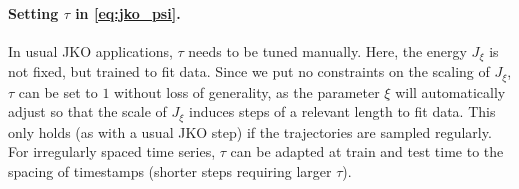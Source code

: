 
\paragraph{Setting $\tau$ in \eqref{eq:jko_psi}.} 
In usual \acrshort{JKO} applications, $\tau$ needs to be tuned manually. Here, the energy $J_\xi$ is not fixed, but trained to fit data. Since we put no constraints on the scaling of $J_\xi$, $\tau$ can be set to $1$ without loss of generality, as the parameter $\xi$ will automatically adjust so that the scale of $J_\xi$ induces steps of a relevant length to fit data. This only holds (as with a usual \acrshort{JKO} step) if the trajectories are sampled regularly. For irregularly spaced time series, $\tau$ can be adapted at train and test time to the spacing of timestamps (shorter steps requiring larger $\tau$).


\begin{table}[t]
    \caption{Evaluation of predictive performance w.r.t. the entropy-regularized Wasserstein distance $W_\varepsilon$ \eqref{eq:ot-reg} of \textsc{JKOnet} and the forward method on the embryoid body scRNA-seq data per time step (using 3 runs).}
    \label{tab:exp_jkonet_cell_pred}
    \centering
{}
\end{table}

